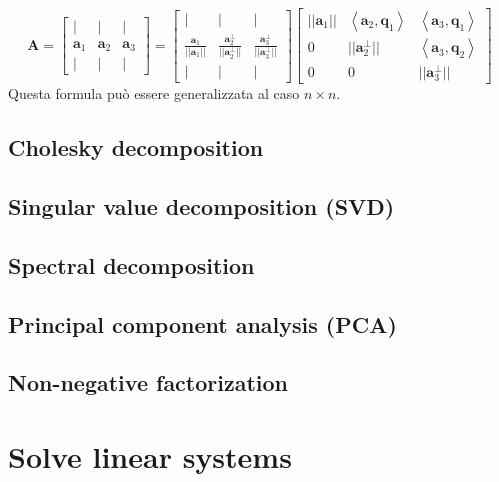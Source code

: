 \documentclass[10pt]{article}
\begin{document}
\begin{equation}
\mathbf{A} = 
\begin{bmatrix}
| & | & | \\
\mathbf{a}_1 & \mathbf{a}_2 & \mathbf{a}_3 \\
| & | & |
\end{bmatrix} = 
\begin{bmatrix}
| & | & | \\
\frac{\mathbf{a}_1}{||\mathbf{a}_1||} & \frac{\mathbf{a}_2^\perp}{||\mathbf{a}_2^\perp||} & \frac{\mathbf{a}_3^\perp}{||\mathbf{a}_3^\perp||} \\
| & | & |
\end{bmatrix}
\begin{bmatrix}
||\mathbf{a}_1|| & \left<\mathbf{a}_2,\mathbf{q}_1\right> & \left<\mathbf{a}_3,\mathbf{q}_1\right> \\
0 & ||\mathbf{a}_2^\perp|| & \left<\mathbf{a}_3,\mathbf{q}_2\right> \\
0 & 0 & ||\mathbf{a}_3^\perp||
\end{bmatrix}
\end{equation}
Questa formula può essere generalizzata al caso $n\times n$.


\subsection{Cholesky decomposition}

\subsection{Singular value decomposition (SVD)}

\subsection{Spectral decomposition}

\subsection{Principal component analysis (PCA)}

\subsection{Non-negative factorization}



\section{Solve linear systems}
\end{document}
